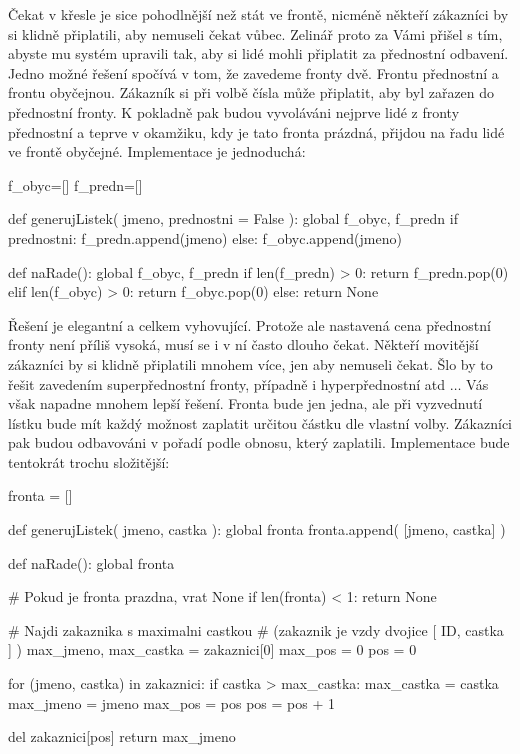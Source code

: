 Čekat v křesle je sice pohodlnější než stát ve frontě, nicméně někteří zákazníci by si klidně připlatili, aby nemuseli čekat vůbec. Zelinář proto
za Vámi přišel s tím, abyste mu systém upravili tak, aby si lidé mohli připlatit za přednostní odbavení. Jedno možné řešení spočívá v tom, že zavedeme
fronty dvě. Frontu přednostní a frontu obyčejnou. Zákazník si při volbě čísla může připlatit, aby byl zařazen do přednostní fronty. K pokladně pak budou
vyvoláváni nejprve lidé z fronty přednostní a teprve v okamžiku, kdy je tato fronta prázdná, přijdou na řadu lidé ve frontě obyčejné. Implementace
je jednoduchá:

\begin{python}
f_obyc=[]
f_predn=[]

def generujListek( jmeno, prednostni = False ):
    global f_obyc, f_predn
    if prednostni:
        f_predn.append(jmeno)
    else:
        f_obyc.append(jmeno)
    
def naRade():
    global f_obyc, f_predn
    if len(f_predn) > 0:
        return f_predn.pop(0)
    elif len(f_obyc) > 0:
        return f_obyc.pop(0)
    else:
        return None
\end{python}

Řešení je elegantní a celkem vyhovující. Protože ale nastavená cena přednostní fronty není příliš vysoká, musí se i v ní často dlouho čekat. 
Někteří movitější zákazníci by si klidně připlatili mnohem více, jen aby nemuseli čekat. Šlo by to řešit zavedením superpřednostní fronty, případně
i hyperpřednostní atd $\ldots$ Vás však napadne mnohem lepší řešení. Fronta bude jen jedna, ale při vyzvednutí lístku bude mít každý možnost zaplatit
určitou částku dle vlastní volby. Zákazníci pak budou odbavováni v pořadí podle obnosu, který zaplatili. Implementace bude tentokrát trochu
složitější:


\begin{python}
fronta = []

def generujListek( jmeno, castka ):
    global fronta
    fronta.append( [jmeno, castka] )


def naRade():
    global fronta

    # Pokud je fronta prazdna, vrat None
    if len(fronta) < 1:
      return None
      
    # Najdi zakaznika s maximalni castkou
    # (zakaznik je vzdy dvojice [ ID, castka ] )
    max_jmeno, max_castka = zakaznici[0]
    max_pos    = 0
    pos        = 0
    
    for (jmeno, castka) in zakaznici:
        if castka > max_castka:
	    max_castka = castka
            max_jmeno = jmeno
            max_pos = pos
        pos = pos + 1
    
    del zakaznici[pos]
    return max_jmeno
\end{python}

